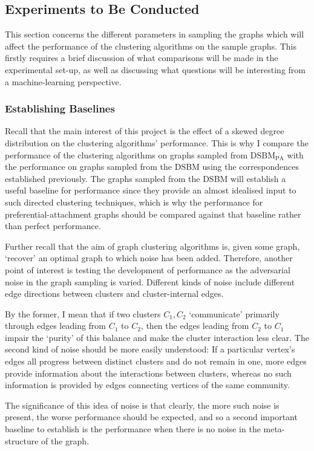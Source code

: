 \subsection{Experiments to Be Conducted}
This section concerns the different parameters in sampling the graphs which will affect the 
performance of the clustering algorithms on the sample graphs. This firstly requires a brief discussion of 
what comparisons will be made in the experimental set-up, as well as discussing what questions 
will be interesting from a machine-learning perspective. 

\subsubsection{Establishing Baselines}
Recall that the main interest of this project is the effect of a skewed degree distribution on the clustering algorithms' performance. This is why I compare the performance of the clustering algorithms on graphs 
sampled from $\mathrm{DSBM}_\mathrm{PA}$ with the performance on graphs sampled from the DSBM  
using the correspondences established previously. The graphs sampled from the DSBM will establish a useful baseline for performance 
since they provide an almost idealised input to such directed clustering techniques, which is why 
the performance for preferential-attachment graphs should be compared against that baseline rather 
than perfect performance.

Further recall that the aim of graph clustering algorithms is, given some graph, `recover' an 
optimal graph to which noise has been added. Therefore, another point of interest is testing the development 
of performance as the adversarial noise in the graph sampling is varied. Different kinds of noise include different edge directions 
between clusters and cluster-internal edges. 

By the former, I mean that if two clusters $C_1, C_2$ `communicate' primarily through edges 
leading from $C_1$ to $C_2$, then the edges leading from $C_2$ to $C_1$ impair the `purity' of 
this balance and make the cluster interaction less clear. The second kind of noise should be more 
easily understood: If a particular vertex's edges all progress between distinct clusters and do 
not remain in one, more edges provide information about the interactions between clusters, whereas 
no such information is provided by edges connecting vertices of the same community.

The 
significance of this idea of noise is that clearly, the more such noise is present, the worse 
performance should be expected, and so a second important baseline to establish is the performance 
when there is no noise in the meta-structure of the graph. 

